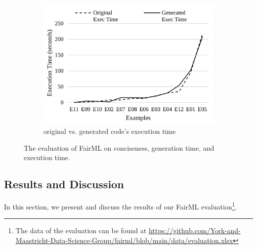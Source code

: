 \documentclass[sigconf]{acmart}
\begin{document}
{\begin{figure}
\begin{subfigure}{0.33\textwidth}
			\includegraphics[width=\textwidth]{figures/eval-execution-time.pdf}
			\caption{original vs. generated code's execution time}
			\label{fig:eval-execution-time}
		\end{subfigure}
		\caption{The evaluation of FairML on conciseness, generation time, and execution time.}
		\label{fig:evaluation}
	\end{figure}
	
	
	\subsection{Results and Discussion}
	\label{sec:result_and_discussion}
	In this section, we present and discuss the results of our FairML evaluation\footnote{The data of the evaluation can be found at \url{https://github.com/York-and-Maastricht-Data-Science-Group/fairml/blob/main/data/evaluation.xlsx}}.
	
}
\end{document}
